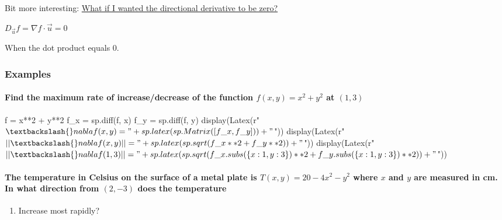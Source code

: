 \documentclass[
  letterpaper,
  DIV=11,
  numbers=noendperiod]{scrartcl}
\let\oldparagraph\paragraph
\renewcommand{\paragraph}[1]{\oldparagraph{#1}\mbox{}}
\newenvironment{Shaded}{\begin{snugshade}}{\end{snugshade}}
\newcommand{\NormalTok}[1]{\textcolor[rgb]{0.00,0.23,0.31}{#1}}
\providecommand{\tightlist}{%
  \setlength{\itemsep}{0pt}\setlength{\parskip}{0pt}}\usepackage{longtable,booktabs,array}
\begin{document}
Bit more interesting: \ul{What if I wanted the directional derivative to
be zero?}

\(D_{\vec{u}}f = \nabla f \cdot \vec{u} = 0\)

When the dot product equals 0.

\subsubsection{Examples}\label{examples-10}

\paragraph{\texorpdfstring{Find the maximum rate of increase/decrease of
the function \(f(x, y) = x^2+y^2\) at
\((1, 3)\)}{Find the maximum rate of increase/decrease of the function f(x, y) = x\^{}2+y\^{}2 at (1, 3)}}\label{find-the-maximum-rate-of-increasedecrease-of-the-function-fx-y-x2y2-at-1-3}

\begin{Shaded}
\begin{Highlighting}[numbers=left,,]
\NormalTok{f = x**2 + y**2}
\NormalTok{f\_x = sp.diff(f, x)}
\NormalTok{f\_y = sp.diff(f, y)}
\NormalTok{display(Latex(r"$\textbackslash{}nabla f(x, y) = " + sp.latex(sp.Matrix([f\_x, f\_y])) + "$"))}
\NormalTok{display(Latex(r"$||\textbackslash{}nabla f(x, y)|| = " + sp.latex(sp.sqrt(f\_x**2 + f\_y**2)) + "$"))}
\NormalTok{display(Latex(r"$||\textbackslash{}nabla f(1, 3)|| = " + sp.latex(sp.sqrt(f\_x.subs(\{x:1, y:3\})**2 + f\_y.subs(\{x:1, y:3\})**2)) + "$"))}
\end{Highlighting}
\end{Shaded}

\paragraph{\texorpdfstring{The temperature in Celsius on the surface of
a metal plate is \(T(x, y) = 20-4x^2-y^2\) where \(x\) and \(y\) are
measured in cm. In what direction from \((2, -3)\) does the
temperature}{The temperature in Celsius on the surface of a metal plate is T(x, y) = 20-4x\^{}2-y\^{}2 where x and y are measured in cm. In what direction from (2, -3) does the temperature}}\label{the-temperature-in-celsius-on-the-surface-of-a-metal-plate-is-tx-y-20-4x2-y2-where-x-and-y-are-measured-in-cm.-in-what-direction-from-2--3-does-the-temperature}

\begin{enumerate}
\def\labelenumi{\alph{enumi}.}
\tightlist
\item
  Increase most rapidly?
\end{enumerate}
\end{document}
